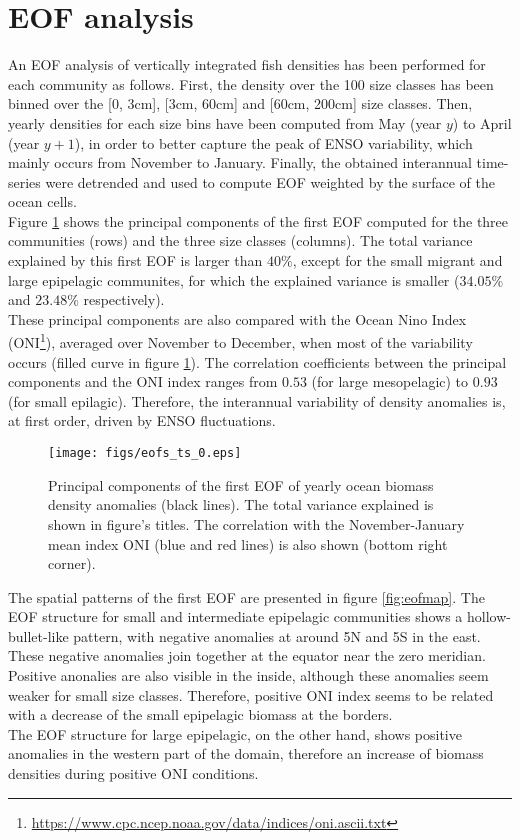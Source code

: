\section{EOF analysis}

An EOF analysis of vertically integrated fish densities has been performed for each community as follows. First, the density over the 100 size classes has been binned over the [0, 3cm], [3cm, 60cm] and [60cm, 200cm] size classes. Then, yearly densities for each size bins have been computed from May (year $y$) to April (year $y + 1$), in order to better capture the peak of ENSO variability, which mainly occurs from November to January. Finally, the obtained interannual time-series were detrended and used to compute EOF weighted by the surface of the ocean cells.\\

Figure \ref{fig:eofpc} shows the principal components of the first EOF computed for the three communities (rows) and the three size classes (columns). The total variance explained by this first EOF 
is larger than $40\%$, except for the small migrant and large epipelagic communites, for which the explained variance is smaller ($34.05\%$ and $23.48\%$ respectively).\\

These principal components are also compared with 
the Ocean Nino Index (ONI\footnote{\url{https://www.cpc.ncep.noaa.gov/data/indices/oni.ascii.txt}}), averaged over November to December, when most of the variability occurs (filled curve in figure \ref{fig:eofpc}). The correlation coefficients between the principal components and the ONI index ranges from $0.53$ (for large mesopelagic) to $0.93$ (for small epilagic). Therefore, the interannual variability of density anomalies is, at first order, driven by ENSO fluctuations. \\

\begin{figure}
    \centering
    \texttt{[image: figs/eofs\_ts\_0.eps]}
    \caption{Principal components of the first EOF of yearly ocean biomass density anomalies (black lines). The total variance explained is shown in figure's titles. The correlation with the November-January mean index ONI (blue and red lines) is also shown (bottom right corner).}
    \label{fig:eofpc}
\end{figure}

The spatial patterns of the first EOF are presented in figure \ref{fig:eofmap}. 
The EOF structure for small and intermediate epipelagic communities shows a hollow-bullet-like pattern, with negative anomalies at around 5N and 5S in the east. These negative anomalies join together at the equator near the zero meridian. Positive anonalies are also visible in the inside, although these anomalies seem weaker for small size classes. Therefore, positive ONI index seems to be related with a decrease of the small epipelagic biomass at the borders. \\ The EOF structure for large epipelagic, on the other hand, shows positive anomalies in the western part of the domain, therefore an increase of biomass densities during positive ONI conditions.

